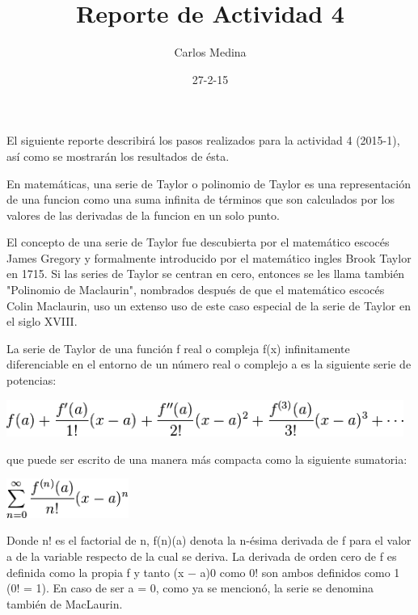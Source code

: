 \documentclass[12pt]{article}
\title{Reporte de Actividad 4}
\author{Carlos Medina}
\date{27-2-15}
\begin{document}
\maketitle


El siguiente reporte describirá los pasos realizados para la actividad 4 (2015-1), así como se mostrarán los resultados de ésta.




\hspace {0.5cm} En matemáticas, una serie de Taylor o polinomio de Taylor es una representación de una funcion como una suma infinita de términos que son calculados por los valores de las derivadas de la funcion en un solo punto.

El concepto de una serie de Taylor fue descubierta por el matemático escocés James Gregory y formalmente introducido por el matemático ingles Brook Taylor en 1715. Si las series de Taylor se centran en cero, entonces se les llama también "Polinomio de Maclaurin", nombrados después de que el matemático escocés Colin Maclaurin, uso un extenso uso de este caso especial de la serie de Taylor en el siglo XVIII.


La serie de Taylor de una función f real o compleja f(x) infinitamente diferenciable en el entorno de un número real o complejo a es la siguiente serie de potencias:

\begin{center}
	\includegraphics[width=13cm]{Tay.png}\\
\end{center}

que puede ser escrito de una manera más compacta como la siguiente sumatoria:

\begin{center}
	\includegraphics[width=4cm]{Taysum.png}\\
\end{center}


Donde n! es el factorial de n, f(n)(a) denota la n-ésima derivada de f para el valor a de la variable respecto de la cual se deriva.
La derivada de orden cero de f es definida como la propia f y tanto (x − a)0 como 0! son ambos definidos como 1 (0! = 1). En caso de ser a = 0, como ya se mencionó, la serie se denomina también de MacLaurin.
\end{document}
